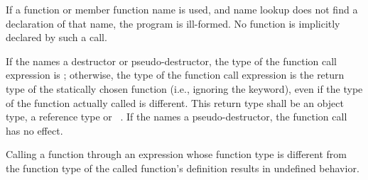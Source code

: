 \pnum
\begin{note}
If a function or member function name is used, and name
lookup does not find a declaration of that name,
the program is ill-formed. No function is implicitly declared by such a
call.
\end{note}

\pnum
If the  names
a destructor or pseudo-destructor,
the type of the function call expression is ; otherwise, the
type of the function call expression is the return type of the
statically chosen function (i.e., ignoring the  keyword),
even if the type of the function actually called is different.
%
This return type shall be an object type, a reference type or \cv{}~.
If the  names a pseudo-destructor,
the function call has no effect.

\pnum
Calling a function through an
expression whose function type is different
from the function type of the called function's
definition results in undefined behavior.

